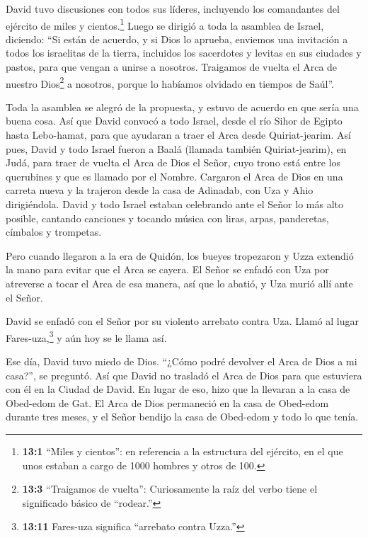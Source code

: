  David tuvo discusiones con todos sus líderes, incluyendo
los comandantes del ejército de miles y cientos.\footnote{\textbf{13:1}
  ``Miles y cientos'': en referencia a la estructura del ejército, en el
  que unos estaban a cargo de 1000 hombres y otros de 100.} 
Luego se dirigió a toda la asamblea de Israel, diciendo: ``Si están de
acuerdo, y si Dios lo aprueba, enviemos una invitación a todos los
israelitas de la tierra, incluidos los sacerdotes y levitas en sus
ciudades y pastos, para que vengan a unirse a nosotros. 
Traigamos de vuelta el Arca de nuestro Dios\footnote{\textbf{13:3}
  ``Traigamos de vuelta'': Curiosamente la raíz del verbo tiene el
  significado básico de ``rodear.''} a nosotros, porque lo habíamos
olvidado en tiempos de Saúl''.

 Toda la asamblea se alegró de la propuesta, y estuvo de
acuerdo en que sería una buena cosa.  Así que David convocó
a todo Israel, desde el río Sihor de Egipto hasta Lebo-hamat, para que
ayudaran a traer el Arca desde Quiriat-jearim.  Así pues,
David y todo Israel fueron a Baalá (llamada también Quiriat-jearim), en
Judá, para traer de vuelta el Arca de Dios el Señor, cuyo trono está
entre los querubines y que es llamado por el Nombre. 
Cargaron el Arca de Dios en una carreta nueva y la trajeron desde la
casa de Adinadab, con Uza y Ahio dirigiéndola.  David y todo
Israel estaban celebrando ante el Señor lo más alto posible, cantando
canciones y tocando música con liras, arpas, panderetas, címbalos y
trompetas.

 Pero cuando llegaron a la era de Quidón, los bueyes
tropezaron y Uzza extendió la mano para evitar que el Arca se cayera.
 El Señor se enfadó con Uza por atreverse a tocar el Arca
de esa manera, así que lo abatió, y Uza murió allí ante el Señor.

 David se enfadó con el Señor por su violento arrebato
contra Uza. Llamó al lugar Fares-uza,\footnote{\textbf{13:11} Fares-uza
  significa ``arrebato contra Uzza.''} y aún hoy se le llama así.

 Ese día, David tuvo miedo de Dios. ``¿Cómo podré devolver
el Arca de Dios a mi casa?'', se preguntó.  Así que David
no trasladó el Arca de Dios para que estuviera con él en la Ciudad de
David. En lugar de eso, hizo que la llevaran a la casa de Obed-edom de
Gat.  El Arca de Dios permaneció en la casa de Obed-edom
durante tres meses, y el Señor bendijo la casa de Obed-edom y todo lo
que tenía.

